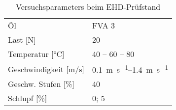 \begin{table}[htbp]
    \centering
    \caption{Versuchsparameters beim EHD-Prüfstand}
    \begin{tabular}{ll}
        Öl & FVA 3 \\
        Last [\si{N}] & 20 \\
        Temperatur [\si{\degreeCelsius}] & 40 – 60 – 80 \\
        Geschwindigkeit [\si[per-mode=symbol]{\meter\per\second}] & \SIrange[per-mode=symbol]{0.1}{1.4}{\meter\per\second} \\
        Geschw. Stufen [\si{\%}] & 40 \\
        Schlupf [\si{\%}] & 0; 5 \\
    \end{tabular}
    \label{tab:ehd_test_params}
\end{table}
